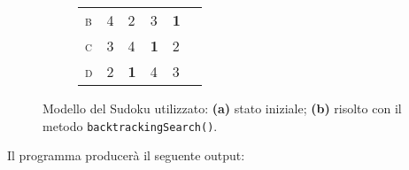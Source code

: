 \begin{figure}[h]
\begin{subfigure}{0.3\textwidth}
\begin{tabular}{m{0.1cm}|m{0.1cm}!{\vrule width 0.1pt}m{0.1cm}|m{0.1cm}!{\vrule width 0.1pt}m{0.1cm}|m{0.1cm}}
            \scshape{b} & 4 & 2 & 3 & {\bf 1} & \\
            \scshape{c} & 3 & 4 & {\bf 1} & 2 &\\
            \scshape{d} & 2 & {\bf 1} & 4 & 3 & \\
        \end{tabular}
        \caption{} \label{fig:after}
    \end{subfigure}
    \caption{Modello del Sudoku utilizzato: {\bf (a)} stato iniziale; {\bf (b)} risolto con il metodo {\tt backtrackingSearch()}.}
\end{figure}



Il programma producerà il seguente output:


